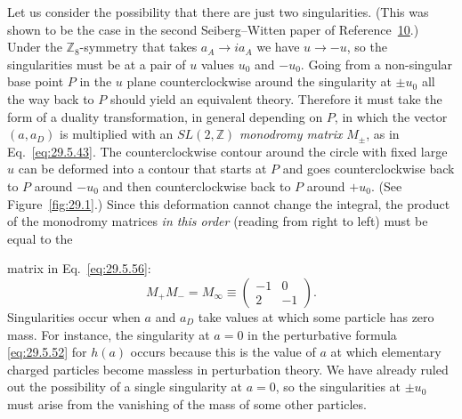 Let us consider the possibility that there are just two singularities. (This
was shown to be the case in the second Seiberg--Witten paper of
Reference~\hyperref[ch29-ref-10]{10}.) Under the
\(\mathbb{Z}_8\)-symmetry that takes \(a_A\longrightarrow ia_A\) we have
\(u\longrightarrow-u\), so the singularities must be at a pair of \(u\)
values \(u_0\) and \(-u_0\). Going from a non-singular base point \(P\) in
the \(u\) plane counterclockwise around the singularity at \(\pm u_0\) all
the way back to \(P\) should yield an equivalent theory. Therefore it must
take the form of a duality transformation, in general depending on \(P\), in
which the vector \((a,a_D)\) is multiplied with an \(SL(2,\mathbb{Z})\)
\textit{monodromy matrix} \(M_\pm\), as in Eq.~\eqref{eq:29.5.43}. The
counterclockwise contour around the circle with fixed large \(u\) can be
deformed into a contour that starts at \(P\) and goes counterclockwise back
to \(P\) around \(-u_0\) and then counterclockwise back to \(P\) around
\(+u_0\). (See Figure~\ref{fig:29.1}.) Since this deformation cannot change
the integral, the product of the monodromy matrices \textit{in this order}
(reading from right to left) must be equal to the


matrix in Eq.~\eqref{eq:29.5.56}:
\begin{equation}
  M_+M_-=M_\infty\equiv
  \begin{pmatrix}
    -1&0\\ 2&-1
  \end{pmatrix}.
  \tag{29.5.57}\label{eq:29.5.57}
\end{equation}
Singularities occur when \(a\) and \(a_D\) take values at which some
particle has zero mass. For instance, the singularity at \(a=0\) in the
perturbative formula \eqref{eq:29.5.52} for \(h(a)\) occurs because this is
the value of \(a\) at which elementary charged particles become massless in
perturbation theory. We have already ruled out the possibility of a single
singularity at \(a=0\), so the singularities at \(\pm u_0\) must arise from
the vanishing of the mass of some other particles.


